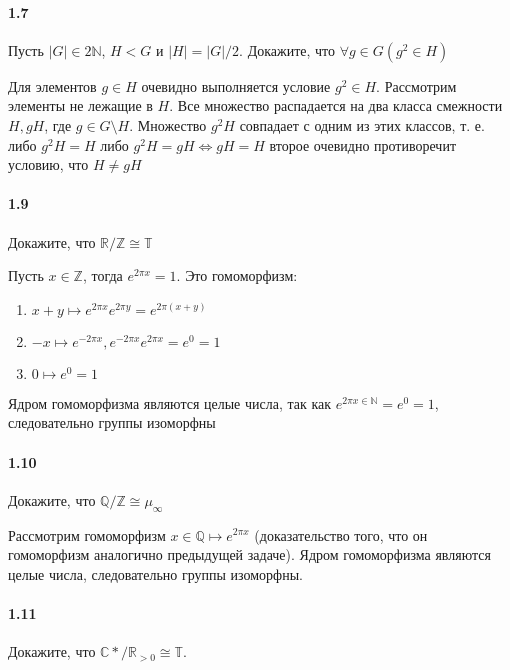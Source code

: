 \documentclass[a4paper,12pt]{article}
\begin{document}
\paragraph{1.7} Пусть $|G| \in 2\mathbb{N}$, $H < G$ и $|H| = |G|/2$. Докажите, что $\forall g \in G \left(g^2 \in H\right)$

\begin{Solution}
Для элементов $g \in H$ очевидно выполняется условие $g^2 \in H$. Рассмотрим элементы не лежащие в $H$. Все множество распадается на два класса смежности $H, gH$, где $g \in G \setminus H$. Множество $g^2H$ совпадает с одним из этих классов, т. е. либо $g^2H = H$ либо $g^2H = gH \Leftrightarrow gH = H$ второе очевидно противоречит условию, что $H \not= gH$
\end{Solution}

\paragraph{1.9} Докажите, что $\mathbb{R}/\mathbb{Z} \cong \mathbb{T}$

\begin{Solution}
Пусть $x \in \mathbb{Z}$, тогда $e^{2 \pi x} = 1$. Это гомоморфизм:
\begin{enumerate}
\item $x+y \mapsto e^{2 \pi x}e^{2 \pi y} = e^{2 \pi \left(x+y\right)}$

\item $-x \mapsto e^{-2 \pi x}, e^{-2 \pi x} e^{2 \pi x} = e^0 = 1$

\item $0 \mapsto e^0 = 1$
\end{enumerate}
Ядром гомоморфизма являются целые числа, так как $e^{2 \pi x \in \mathbb{N}} = e^0 = 1$, следовательно группы изоморфны
\end{Solution}

\paragraph{1.10} Докажите, что $\mathbb{Q}/\mathbb{Z} \cong \mu_{\infty}$

\begin{Solution}
Рассмотрим гомоморфизм $x \in \mathbb{Q} \mapsto e^{2 \pi x}$ (доказательство того, что он гомоморфизм аналогично предыдущей задаче).
Ядром гомоморфизма являются целые числа, следовательно группы изоморфны.
\end{Solution}

\paragraph{1.11} Докажите, что ${\mathbb{C}*}/{\mathbb{R}_{>0}} \cong \mathbb{T}$.
\end{document}
